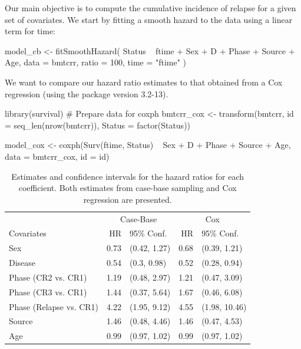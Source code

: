 Our main objective is to compute the cumulative incidence of relapse for
a given set of covariates. We start by fitting a smooth hazard to the
data using a linear term for time:

\begin{Schunk}
\begin{Sinput}
model_cb <- fitSmoothHazard(
  Status ~ ftime + Sex + D + Phase + Source + Age,
  data = bmtcrr,
  ratio = 100,
  time = "ftime"
)
\end{Sinput}
\end{Schunk}

We want to compare our hazard ratio estimates to that obtained from a
Cox regression (using the  package version 3.2-13).

\begin{Schunk}
\begin{Sinput}
library(survival)
# Prepare data for coxph
bmtcrr_cox <- transform(bmtcrr, 
                        id = seq_len(nrow(bmtcrr)),
                        Status = factor(Status))

model_cox <- coxph(Surv(ftime, Status) ~ Sex + D + Phase + Source + Age,
                   data = bmtcrr_cox, id = id)
\end{Sinput}
\end{Schunk}

\begin{Schunk}
\begin{table}

\caption{\label{tab:bmtcrr-cis}Estimates and confidence intervals for the hazard ratios for each coefficient. Both estimates from case-base sampling and Cox regression are presented.}
\centering
\begin{tabular}[t]{lrlrl}
\toprule
\multicolumn{1}{c}{ } & \multicolumn{2}{c}{Case-Base} & \multicolumn{2}{c}{Cox} \\
\cmidrule(l{3pt}r{3pt}){2-3} \cmidrule(l{3pt}r{3pt}){4-5}
Covariates & HR & 95\% Conf. & HR & 95\% Conf.\\
\midrule
Sex & 0.73 & (0.42, 1.27) & 0.68 & (0.39, 1.21)\\
Disease & 0.54 & (0.3, 0.98) & 0.52 & (0.28, 0.94)\\
Phase (CR2 vs. CR1) & 1.19 & (0.48, 2.97) & 1.21 & (0.47, 3.09)\\
Phase (CR3 vs. CR1) & 1.44 & (0.37, 5.64) & 1.67 & (0.46, 6.08)\\
Phase (Relapse vs. CR1) & 4.22 & (1.95, 9.12) & 4.55 & (1.98, 10.46)\\
\addlinespace
Source & 1.46 & (0.48, 4.46) & 1.46 & (0.47, 4.53)\\
Age & 0.99 & (0.97, 1.02) & 0.99 & (0.97, 1.02)\\
\bottomrule
\end{tabular}
\end{table}

\end{Schunk}


